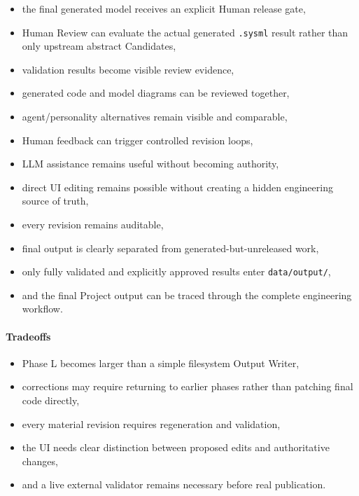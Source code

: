\begin{itemize}
\tightlist
\item
  the final generated model receives an explicit Human release gate,
\item
  Human Review can evaluate the actual generated \texttt{.sysml} result rather than only upstream abstract Candidates,
\item
  validation results become visible review evidence,
\item
  generated code and model diagrams can be reviewed together,
\item
  agent/personality alternatives remain visible and comparable,
\item
  Human feedback can trigger controlled revision loops,
\item
  LLM assistance remains useful without becoming authority,
\item
  direct UI editing remains possible without creating a hidden engineering source of truth,
\item
  every revision remains auditable,
\item
  final output is clearly separated from generated-but-unreleased work,
\item
  only fully validated and explicitly approved results enter \texttt{data/output/},
\item
  and the final Project output can be traced through the complete engineering workflow.
\end{itemize}

\hypertarget{tradeoffs}{%
\paragraph{Tradeoffs}\label{tradeoffs}}

\begin{itemize}
\tightlist
\item
  Phase L becomes larger than a simple filesystem Output Writer,
\item
  corrections may require returning to earlier phases rather than patching final code directly,
\item
  every material revision requires regeneration and validation,
\item
  the UI needs clear distinction between proposed edits and authoritative changes,
\item
  and a live external validator remains necessary before real publication.
\end{itemize}

